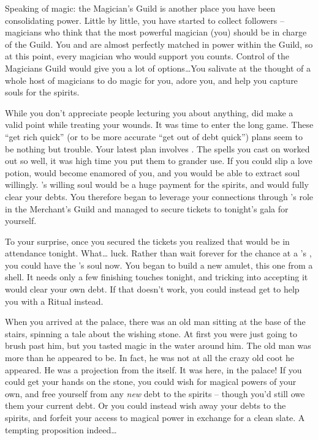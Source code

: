 \documentclass[char]{NeptuneBall}
\begin{document}
Speaking of magic: the Magician's Guild is another place you have been consolidating power. Little by little, you have started to collect followers -- magicians who think that the most powerful magician (you) should be in charge of the Guild. You and \cManta{} are almost perfectly matched in power within the Guild, so at this point, every magician who would support you counts. Control of the Magicians Guild would give you a lot of options\ldots You salivate at the thought of a whole host of magicians to do magic for you, adore you, and help you capture souls for the spirits.

While you don't appreciate people lecturing you about anything, \cManta{} did make a valid point while \cManta{\they} \cManta{\were} treating your wounds. It was time to enter the long game. These ``get rich quick'' (or to be more accurate ``get out of debt quick'') plans seem to be nothing but trouble. Your latest plan involves \cKing{\King} \cKing{}. The spells you cast on \cSlave{\MYname} worked out so well, it was high time you put them to grander use. If you could slip \cKing{} a love potion, \cKing{} would become enamored of you, and you would be able to extract \cKing{\their} soul willingly. \cKing{}'s willing soul would be a huge payment for the spirits, and would fully clear your debts. You therefore began to leverage your connections through \cSlave{\MYname}'s role in the Merchant's Guild and managed to secure tickets to tonight's gala for yourself.

To your surprise, once you secured the tickets you realized that \cAriel{\King} \cAriel{} would be in attendance tonight. What\ldots{} luck. Rather than wait forever for the chance at a \cAriel{}'s \cArielsSon{\offspring}, you could have the \cAriel{\parent}'s soul now. You began to build a new amulet, this one from a shell. It needs only a few finishing touches tonight, and tricking \cAriel{\them} into accepting it would clear your own debt.  If that doesn't work, you could instead get \cAriel{\them} to help you with a \gRitual{} Ritual instead.

When you arrived at the palace, there was an old man sitting at the base of the stairs, spinning a tale about the wishing stone. At first you were just going to brush past him, but you tasted magic in the water around him. The old man was more than he appeared to be. In fact, he was not at all the crazy old coot he appeared. He was a projection from the \iWishingStone{\MYname} itself. It was here, in the palace! If you could get your hands on the stone, you could wish for magical powers of your own, and free yourself from any \emph{new} debt to the spirits -- though you'd still owe them your current debt. Or you could instead wish away your debts to the spirits, and forfeit your access to magical power in exchange for a clean slate. A tempting proposition indeed\ldots{}
\end{document}
